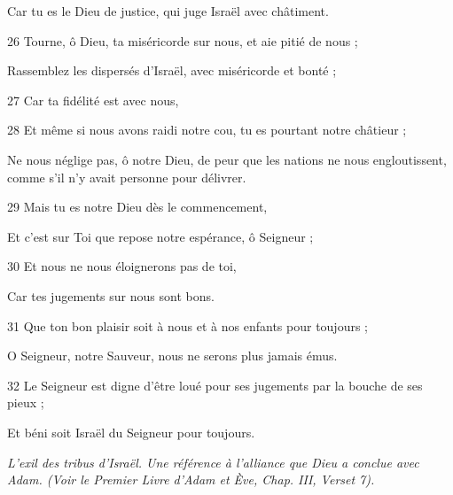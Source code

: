 \par     Car tu es le Dieu de justice, qui juge Israël avec châtiment.
\par   
\par 26 Tourne, ô Dieu, ta miséricorde sur nous, et aie pitié de nous ;
\par     Rassemblez les dispersés d'Israël, avec miséricorde et bonté ;
\par 27 Car ta fidélité est avec nous,
\par 28 Et même si nous avons raidi notre cou, tu es pourtant notre châtieur ;
\par     Ne nous néglige pas, ô notre Dieu, de peur que les nations ne nous engloutissent, comme s'il n'y avait personne pour délivrer.
\par   
\par 29 Mais tu es notre Dieu dès le commencement,
\par     Et c’est sur Toi que repose notre espérance, ô Seigneur ;
\par 30 Et nous ne nous éloignerons pas de toi,
\par     Car tes jugements sur nous sont bons.
\par 31 Que ton bon plaisir soit à nous et à nos enfants pour toujours ;
\par     O Seigneur, notre Sauveur, nous ne serons plus jamais émus.
\par 32 Le Seigneur est digne d'être loué pour ses jugements par la bouche de ses pieux ;
\par     Et béni soit Israël du Seigneur pour toujours.


\par \textit{L'exil des tribus d'Israël. Une référence à l'alliance que Dieu a conclue avec Adam. (Voir le Premier Livre d'Adam et Ève, Chap. III, Verset 7).}

